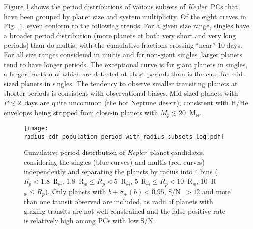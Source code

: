 \documentclass{aastex62}
\newcommand{\ik}{{\it Kepler~}}
\begin{document}
Figure \ref{fig:cdf_log3binradiisplit} shows the period distributions of various subsets of \ik PCs that have been grouped by planet size and system multiplicity.  Of the eight curves in Fig.~\ref{fig:cdf_log3binradiisplit}, seven conform to the following trends: For a given size range, singles have a broader period distribution (more planets at both very short and very long periods) than do multis, with the cumulative fractions crossing ``near'' 10 days.  For all size ranges considered in multis and for non-giant singles, larger planets tend to have longer periods.  The exceptional curve is for giant planets in singles, a larger fraction of which are detected at short periods than is the case for mid-sized planets in singles.  The tendency to observe smaller transiting planets at shorter periods is consistent with observational biases.  Mid-sized planets with $P \lesssim 2$~days are quite uncommon (the hot Neptune desert), consistent with H/He envelopes being stripped from close-in planets with $M_p \lesssim 20$~M$_\oplus$. 

\begin{figure}[!hbt]
    \centering
    \texttt{[image: radius\_cdf\_population\_period\_with\_radius\_subsets\_log.pdf]}
    \caption{Cumulative period distribution of \ik planet candidates, considering the singles (blue curves) and multis (red curves) independently and separating the planets by radius into 4 bins ($R_p < 1.8$~R$_\oplus, \, 1.8$~R$_\oplus \leq R_p < 5$~R$_\oplus,\,5$~R$_\oplus \leq R_p < 10$~R$_\oplus$,  10~R$_\oplus \leq R_p$). Only planets with $b + \sigma_+(b) < 0.95$, S/N~$> 12$ and more than one transit observed are included, as radii of planets with grazing transits are not well-constrained and the false positive rate is relatively high among PCs with low S/N.}%
    \label{fig:cdf_log3binradiisplit}
\end{figure}
\end{document}
